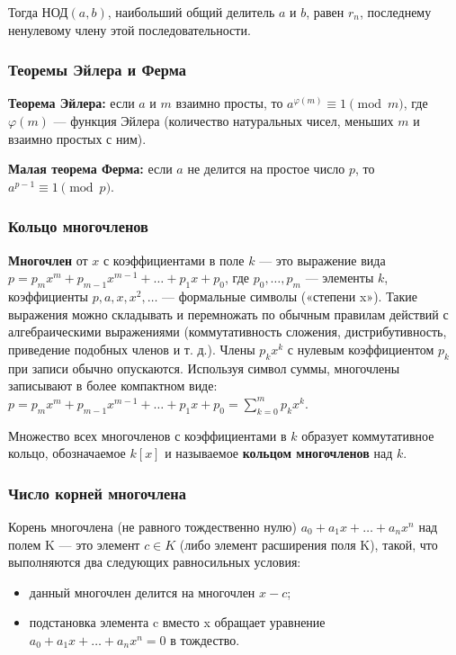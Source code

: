 \documentclass[12pt]{matmex-diploma}
\begin{document}
            Тогда НОД$(a, b)$, наибольший общий делитель $a$ и $b$, равен $r_{n}$, последнему ненулевому члену этой последовательности.
            
        \subsubsection*{Теоремы Эйлера и Ферма}
            \textbf{Теорема Эйлера:} если $a$ и $m$ взаимно просты, то $a^{\varphi(m)} \equiv 1 \pmod m$, где $\varphi(m)$ — функция Эйлера (количество натуральных чисел, меньших $m$ и взаимно простых с ним).
            
            \textbf{Малая теорема Ферма:} если $a$ не делится на простое число $p$, то \\$a^{{p-1}}\equiv 1{\pmod  p}$.
            
        \subsubsection*{Кольцо многочленов}
            \textbf{Многочлен} от $x$ с коэффициентами в поле $k$ — это выражение вида $p=p_{m}x^{m}+p_{m-1}x^{m-1}+\dots +p_{1}x+p_{0}$, где $p_0, \dots, p_m$ — элементы $k$, коэффициенты $p, a, x, x^{2}, \dots$ — формальные символы («степени x»). Такие выражения можно складывать и перемножать по обычным правилам действий с алгебраическими выражениями (коммутативность сложения, дистрибутивность, приведение подобных членов и т. д.). Члены $p_kx^{k}$ с нулевым коэффициентом $p_k$ при записи обычно опускаются. Используя символ суммы, многочлены записывают в более компактном виде: \\$p=p_{m}x^{m}+p_{m-1}x^{m-1}+\dots +p_{1}x+p_{0}=\sum _{k=0}^{m}p_{k}x^{k}$.
            
            Множество всех многочленов с коэффициентами в $k$ образует коммутативное кольцо, обозначаемое $k[x]$ и называемое \textbf{кольцом многочленов} над $k$.
            
        \subsubsection*{Число корней многочлена}
            Корень многочлена (не равного тождественно нулю) $a_{0}+a_{1}x+\dots +a_{n}x^{n}$ над полем K — это элемент $c\in K$ (либо элемент расширения поля K), такой, что выполняются два следующих равносильных условия:
            \begin{itemize}
                \item данный многочлен делится на многочлен $x-c$;
                \item подстановка элемента c вместо x обращает уравнение \\$a_{0}+a_{1}x+\dots +a_{n}x^{n}=0$ в тождество.
            \end{itemize}   
            
\end{document}
